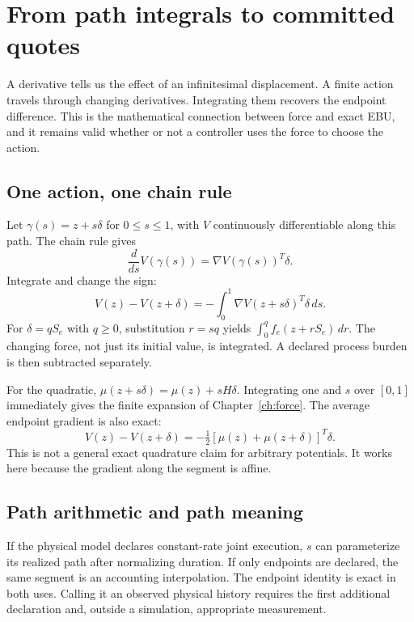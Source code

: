 \chapter{From path integrals to committed quotes}\label{ch:quotes}
A derivative tells us the effect of an infinitesimal displacement. A finite
action travels through changing derivatives. Integrating them recovers the
endpoint difference. This is the mathematical connection between force and
exact EBU, and it remains valid whether or not a controller uses the force
to choose the action.

\section{One action, one chain rule}
Let $\gamma(s)=z+s\delta$ for $0\leq s\leq1$, with $V$ continuously
differentiable along this path. The chain rule gives
\begin{equation}
 \frac{d}{ds}V(\gamma(s))=\nabla V(\gamma(s))^T\delta.
\end{equation}
Integrate and change the sign:
\begin{equation}\label{eq:path}
 V(z)-V(z+\delta)
 =-\int_0^1\nabla V(z+s\delta)^T\delta\,ds.
\end{equation}
For $\delta=qS_e$ with $q\geq0$, substitution $r=sq$ yields
$\int_0^q f_e(z+rS_e)\,dr$. The changing force, not just its initial
value, is integrated. A declared process burden is then subtracted separately.

For the quadratic, $\mu(z+s\delta)=\mu(z)+sH\delta$. Integrating one
and $s$ over $[0,1]$ immediately gives the finite expansion of Chapter~\ref{ch:force}.
The average endpoint gradient is also exact:
\begin{equation}
 V(z)-V(z+\delta)
 =-\tfrac12[\mu(z)+\mu(z+\delta)]^T\delta.
\end{equation}
This is not a general exact quadrature claim for arbitrary potentials. It
works here because the gradient along the segment is affine.

\section{Path arithmetic and path meaning}
If the physical model declares constant-rate joint execution, $s$ can
parameterize its realized path after normalizing duration. If only endpoints
are declared, the same segment is an accounting interpolation. The endpoint
identity is exact in both uses. Calling it an observed physical history
requires the first additional declaration and, outside a simulation,
appropriate measurement.

